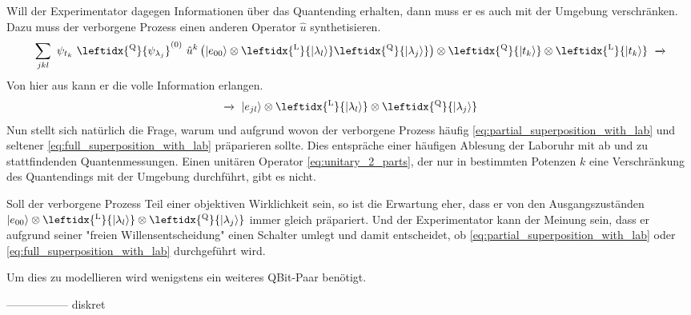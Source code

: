 \documentclass[12pt]{article}
\begin{document}
Will der Experimentator dagegen Informationen über das Quantending erhalten, dann muss er es auch mit der Umgebung verschränken. Dazu muss der verborgene Prozess einen anderen Operator $\hat{u}$ synthetisieren.
\begin{equation}
\label{eq:full_superposition_with_lab}
\sum_{jkl} \ \psi_{t_k}\ \leftidx{^\mathrm{Q}}{\psi_{\lambda_j}}^{(0)}\ 
\hat{u}^k \left( \ket{e_{00}} \otimes \leftidx{^\mathrm{L}}{\ket{\lambda_l}} 
\leftidx{^\mathrm{Q}}{\ket{\lambda_j}} \right) 
\otimes \leftidx{^\mathrm{Q}}{\ket{t_k}}
\otimes \leftidx{^\mathrm{L}}{\ket{t_k}}
\ \xrightarrow{}
\end{equation}
Von hier aus kann er die volle Information erlangen.
\begin{equation*}
\xrightarrow{}\ \ket{e_{jl}} 
\otimes \leftidx{^\mathrm{L}}{\ket{\lambda_l}} 
\otimes \leftidx{^\mathrm{Q}}{\ket{\lambda_j}}
\end{equation*}
Nun stellt sich natürlich die Frage, warum und aufgrund wovon der verborgene Prozess häufig \eqref{eq:partial_superposition_with_lab} und seltener \eqref{eq:full_superposition_with_lab} präparieren sollte. Dies entspräche einer häufigen Ablesung der Laboruhr mit ab und zu stattfindenden Quantenmessungen. Einen unitären Operator \eqref{eq:unitary_2_parts}, der nur in bestimmten Potenzen $k$ eine Verschränkung des Quantendings mit der Umgebung durchführt, gibt es nicht.

Soll der verborgene Prozess Teil einer objektiven Wirklichkeit sein, so ist die Erwartung eher, dass er von den Ausgangszuständen $\ket{e_{00}} \otimes \leftidx{^\mathrm{L}}{\ket{\lambda_l}} \otimes \leftidx{^\mathrm{Q}}{\ket{\lambda_j}}$ immer gleich präpariert. Und der Experimentator kann der Meinung sein, dass er aufgrund seiner "freien Willensentscheidung" einen Schalter umlegt und damit entscheidet, ob \eqref{eq:partial_superposition_with_lab} oder \eqref{eq:full_superposition_with_lab} durchgeführt wird.

Um dies zu modellieren wird wenigstens ein weiteres QBit-Paar benötigt. 

-----------------
diskret
\end{document}

